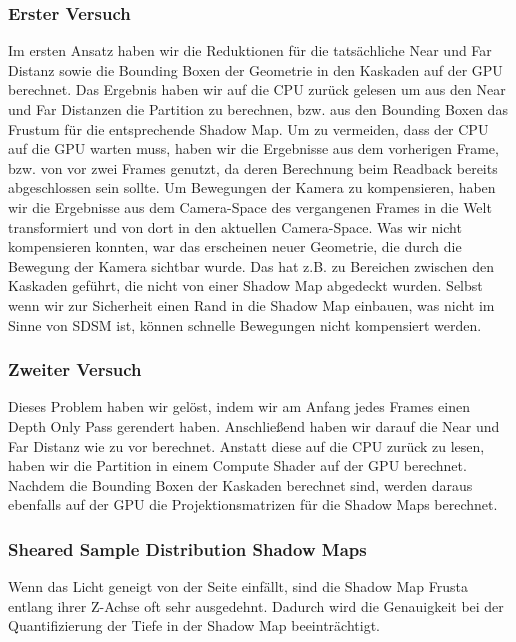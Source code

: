\documentclass[runningheaders,a4paper]{llncs}
\begin{document}
\subsubsection{Erster Versuch}
Im ersten Ansatz haben wir die Reduktionen für die tatsächliche Near und Far Distanz sowie die Bounding Boxen der Geometrie in den Kaskaden auf der GPU berechnet.
Das Ergebnis haben wir auf die CPU zurück gelesen um aus den Near und Far Distanzen die Partition zu berechnen, bzw. aus den Bounding Boxen das Frustum für die entsprechende Shadow Map.
Um zu vermeiden, dass der CPU auf die GPU warten muss, haben wir die Ergebnisse aus dem vorherigen Frame, bzw. von vor zwei Frames genutzt, da deren Berechnung beim Readback bereits abgeschlossen sein sollte.
Um Bewegungen der Kamera zu kompensieren, haben wir die Ergebnisse aus dem Camera-Space des vergangenen Frames in die Welt transformiert und von dort in den aktuellen Camera-Space.
Was wir nicht kompensieren konnten, war das erscheinen neuer Geometrie, die durch die Bewegung der Kamera sichtbar wurde.
Das hat z.B. zu Bereichen zwischen den Kaskaden geführt, die nicht von einer Shadow Map abgedeckt wurden.
Selbst wenn wir zur Sicherheit einen Rand in die Shadow Map einbauen, was nicht im Sinne von SDSM ist, können schnelle Bewegungen nicht kompensiert werden.

\subsubsection{Zweiter Versuch}
Dieses Problem haben wir gelöst, indem wir am Anfang jedes Frames einen Depth Only Pass gerendert haben.
Anschließend haben wir darauf die Near und Far Distanz wie zu vor berechnet.
Anstatt diese auf die CPU zurück zu lesen, haben wir die Partition in einem Compute Shader auf der GPU berechnet.
Nachdem die Bounding Boxen der Kaskaden berechnet sind, werden daraus ebenfalls auf der GPU die Projektionsmatrizen für die Shadow Maps berechnet.


\subsubsection{Sheared Sample Distribution Shadow Maps}
Wenn das Licht geneigt von der Seite einfällt, sind die Shadow Map Frusta entlang ihrer Z-Achse oft sehr ausgedehnt.
Dadurch wird die Genauigkeit bei der Quantifizierung der Tiefe in der Shadow Map beeinträchtigt.
\end{document}

